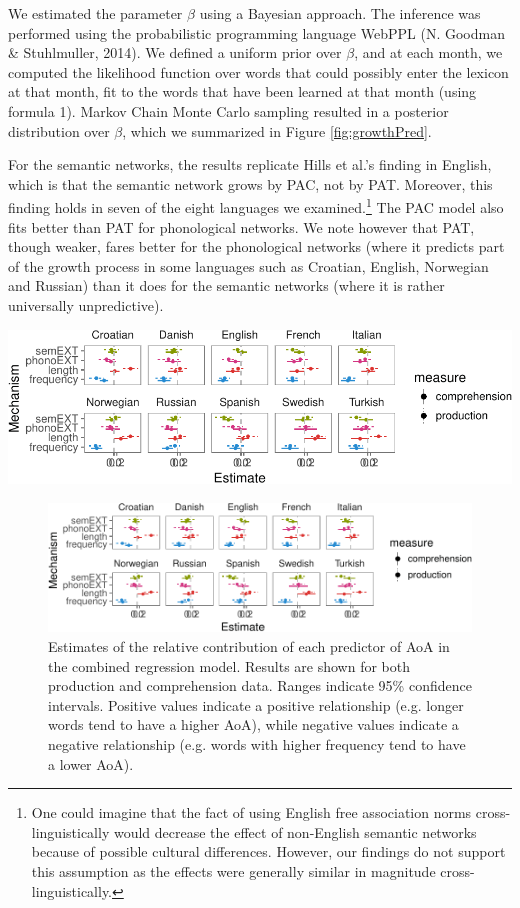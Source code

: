\documentclass[english,floatsintext,man]{apa6}
\theoremstyle{definition}
\theoremstyle{definition}
\theoremstyle{definition}
\theoremstyle{remark}
\begin{document}
We estimated the parameter \(\beta\) using a Bayesian approach. The
inference was performed using the probabilistic programming language
WebPPL (N. Goodman \& Stuhlmuller, 2014). We defined a uniform prior
over \(\beta\), and at each month, we computed the likelihood function
over words that could possibly enter the lexicon at that month, fit to
the words that have been learned at that month (using formula 1). Markov
Chain Monte Carlo sampling resulted in a posterior distribution over
\(\beta\), which we summarized in Figure \ref{fig:growthPred}.

For the semantic networks, the results replicate Hills et al.'s finding
in English, which is that the semantic network grows by PAC, not by PAT.
Moreover, this finding holds in seven of the eight languages we
examined.\footnote{One could imagine that the fact of using English free association norms cross-linguistically would decrease the effect of non-English semantic networks because of possible cultural differences. However, our findings do not support this assumption as the effects were generally similar in magnitude cross-linguistically.}
The PAC model also fits better than PAT for phonological networks. We
note however that PAT, though weaker, fares better for the phonological
networks (where it predicts part of the growth process in some languages
such as Croatian, English, Norwegian and Russian) than it does for the
semantic networks (where it is rather universally unpredictive).

\includegraphics{ms_files/figure-latex/unnamed-chunk-6-1.pdf}

\begin{figure}[!h]
\includegraphics[width=\textwidth]{ms_files/figure-latex/staticPred-1} \caption{Estimates of the relative contribution of each predictor of AoA in the combined regression model. Results are shown for both production and comprehension data. Ranges indicate 95\% confidence intervals. Positive values indicate a positive relationship (e.g. longer words tend to have a higher AoA), while negative values indicate a negative relationship (e.g. words with higher frequency tend to have a lower AoA).}\label{fig:staticPred}
\end{figure}
\end{document}
